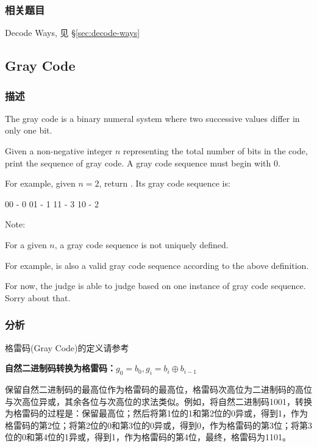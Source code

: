 \subsubsection{相关题目}
\begindot
\item Decode Ways, 见 \S \ref{sec:decode-ways}
\myenddot


\subsection{Gray Code} %
\label{sec:gray-code}


\subsubsection{描述}
The gray code is a binary numeral system where two successive values differ in only one bit.

Given a non-negative integer $n$ representing the total number of bits in the code, print the sequence of gray code. A gray code sequence must begin with 0.

For example, given $n = 2$, return \fn{[0,1,3,2]}. Its gray code sequence is:
\begin{Code}
00 - 0
01 - 1
11 - 3
10 - 2
\end{Code}

Note:
\begindot
\item For a given $n$, a gray code sequence is not uniquely defined.
\item For example, \fn{[0,2,3,1]} is also a valid gray code sequence according to the above definition.
\item For now, the judge is able to judge based on one instance of gray code sequence. Sorry about that.
\myenddot


\subsubsection{分析}
格雷码(Gray Code)的定义请参考 

\textbf{自然二进制码转换为格雷码：$g_0=b_0, g_i=b_i \oplus b_{i-1}$}

保留自然二进制码的最高位作为格雷码的最高位，格雷码次高位为二进制码的高位与次高位异或，其余各位与次高位的求法类似。例如，将自然二进制码1001，转换为格雷码的过程是：保留最高位；然后将第1位的1和第2位的0异或，得到1，作为格雷码的第2位；将第2位的0和第3位的0异或，得到0，作为格雷码的第3位；将第3位的0和第4位的1异或，得到1，作为格雷码的第4位，最终，格雷码为1101。

